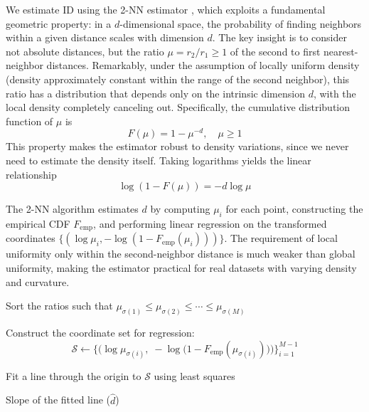 We estimate ID using the 2-NN estimator \citep{facco2017estimating}, which exploits a fundamental geometric property: in a $d$-dimensional space, the probability of finding neighbors within a given distance scales with dimension $d$. The key insight is to consider not absolute distances, but the ratio $\mu = r_2/r_1 \geq 1$ of the second to first nearest-neighbor distances. Remarkably, under the assumption of locally uniform density (density approximately constant within the range of the second neighbor), this ratio has a distribution that depends only on the intrinsic dimension $d$, with the local density completely canceling out. Specifically, the cumulative distribution function of $\mu$ is \[F(\mu) = 1 - \mu^{-d}, \quad \mu \geq 1\] 
This property makes the estimator robust to density variations, since we never need to estimate the density itself. Taking logarithms yields the linear relationship \[\log(1 - F(\mu)) = -d \log \mu\]

The 2-NN algorithm estimates $d$ by computing $\mu_i$ for each point, constructing the empirical CDF $F_{\text{emp}}$, and performing linear regression on the transformed coordinates $\{(\log \mu_i, -\log(1 - F_{\text{emp}}(\mu_i)))\}$. The requirement of local uniformity only within the second-neighbor distance is much weaker than global uniformity, making the estimator practical for real datasets with varying density and curvature. 

\begin{algorithm}[H]
\caption{2-NN Intrinsic Dimension Estimation}
\label{alg:2nn}



Sort the ratios such that $\mu_{\sigma(1)} \le \mu_{\sigma(2)} \le \cdots \le \mu_{\sigma(M)}$\;


Construct the coordinate set for regression:
\[
\mathcal{S} \gets \Big\{ \big(\log \mu_{\sigma(i)},\; -\log \!\big(1 - F_{\text{emp}}(\mu_{\sigma(i)})\big)\big) \Big\}_{i=1}^{M-1}
\]

Fit a line through the origin to $\mathcal{S}$ using least squares\;

\Return Slope of the fitted line ($\hat d$)\;

\end{algorithm}



